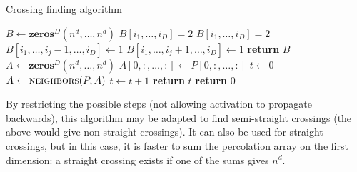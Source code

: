 \begin{algorithm}[!h]
	\caption{Crossing finding algorithm}\label{algo:crossingFinding}
	\begin{algorithmic}[1]
		\State $B \gets \textbf{zeros$^D$}(n^d,\dots,n^d)$ 
		\State $B[i_1,\dots,i_D] = 2$ 
		\EndIf
		\State $B[i_1,\dots,i_D] = 2$ 
		\State $B[i_1,\dots,i_j-1,\dots,i_D] \gets 1$ 
		\EndIf
		\State $B[i_1,\dots,i_j+1,\dots,i_D] \gets 1$ 
		\EndIf
		\EndFor
		\EndIf
		\EndFor
		\State \textbf{return} $B$
		\EndProcedure
		\State $A \gets \textbf{zeros$^D$}(n^d,\dots,n^d)$ 
		\State $A[0,:,\dots,:] \gets P[0,:,\dots,:]$ 
		\State $t \gets 0$
		\State $A \gets \textsc{neighbors}(P,A)$ 
		\State $t \gets t+1$
		\EndWhile
		\State \textbf{return} $t$
		\Else
		\State \textbf{return} $0$
		\EndIf
		\EndProcedure
	\end{algorithmic}
\end{algorithm}

By restricting the possible steps (not allowing activation to propagate backwards), this algorithm may be adapted to find semi-straight crossings (the above would give non-straight crossings).
It can also be used for straight crossings, but in this case, it is faster to sum the percolation array on the first dimension: a straight crossing exists if one of the sums gives $n^d$.


